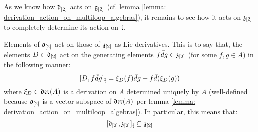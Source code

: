         As we know how $\mathfrak{d}_{[2]}$ acts on $\mathfrak{g}_{[2]}$ (cf. lemma \ref{lemma: derivation_action_on_multiloop_algebras}), it remains to see how it acts on $\mathfrak{z}_{[2]}$ to completely determine its action on $\mathfrak{t}$. 
        \begin{lemma} \label{lemma: derivation_action_on_toroidal_centres}
            Elements of $\mathfrak{d}_{[2]}$ act on those of $\mathfrak{z}_{[2]}$ as Lie derivatives. This is to say that, the elements $D \in \mathfrak{d}_{[2]}$ act on the generating elements $f \bar{d}g \in \mathfrak{z}_{[2]}$ (for some $f, g \in A$) in the following manner:
                $$[D, f \bar{d}g]_{\hat{\mathfrak{t}}} = \xi_D(f) \bar{d}g + f \bar{d}(\xi_D(g))$$
            where $\xi_D \in \mathfrak{der}(A)$ is a derivation on $A$ determined uniquely by $A$ (well-defined because $\mathfrak{d}_{[2]}$ is a vector subspace of $\mathfrak{der}(A)$ per lemma \ref{lemma: derivation_action_on_multiloop_algebras}). In particular, this means that:
                $$[\mathfrak{d}_{[2]}, \mathfrak{z}_{[2]}]_{\hat{\mathfrak{t}}} \subseteq \mathfrak{z}_{[2]}$$
        \end{lemma}
